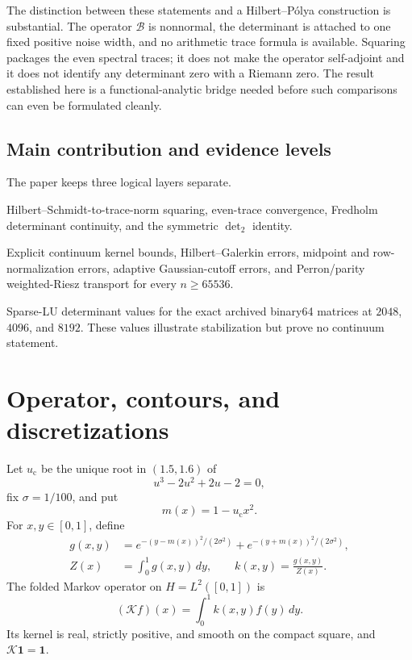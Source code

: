 \documentclass[11pt]{article}
\theoremstyle{definition}
\theoremstyle{remark}
\newcommand{\cK}{\mathcal K}
\newcommand{\cB}{\mathcal B}
\newcommand{\uc}{u_{\mathrm c}}
\begin{document}
The distinction between these statements and a Hilbert--P\'olya
construction is substantial.  The operator $\cB$ is nonnormal, the
determinant is attached to one fixed positive noise width, and no arithmetic
trace formula is available.  Squaring packages the even spectral traces; it
does not make the operator self-adjoint and it does not identify any
determinant zero with a Riemann zero.  The result established here is a
functional-analytic bridge needed before such comparisons can even be
formulated cleanly.

\subsection*{Main contribution and evidence levels}

The paper keeps three logical layers separate.
\begin{description}[leftmargin=3.2cm,style=nextline]
 \item[Analytic theorem]
 Hilbert--Schmidt-to-trace-norm squaring, even-trace convergence, Fredholm
 determinant continuity, and the symmetric $\det_2$ identity.
 \item[Outward certificate]
 Explicit continuum kernel bounds, Hilbert--Galerkin errors, midpoint and
 row-normalization errors, adaptive Gaussian-cutoff errors, and
 Perron/parity weighted-Riesz transport for every $n\ge65536$.
 \item[Floating diagnostic]
 Sparse-LU determinant values for the exact archived binary64 matrices at
 $2048$, $4096$, and $8192$.  These values illustrate stabilization but
 prove no continuum statement.
\end{description}

\section{Operator, contours, and discretizations}
\label{sec:operator}

Let $\uc$ be the unique root in $(1.5,1.6)$ of
\[
 u^3-2u^2+2u-2=0,
\]
fix $\sigma=1/100$, and put
\[
 m(x)=1-\uc x^2.
\]
For $x,y\in[0,1]$, define
\begin{align}
 g(x,y)&=
 e^{-(y-m(x))^2/(2\sigma^2)}
 +e^{-(y+m(x))^2/(2\sigma^2)},
 \label{eq:g-kernel}\\
 Z(x)&=\int_0^1g(x,y)\,dy,
 \qquad
 k(x,y)=\frac{g(x,y)}{Z(x)}.
 \label{eq:normalized-kernel}
\end{align}
The folded Markov operator on $H=L^2([0,1])$ is
\begin{equation}
 (\cK f)(x)=\int_0^1k(x,y)f(y)\,dy.
 \label{eq:markov-operator}
\end{equation}
Its kernel is real, strictly positive, and smooth on the compact square,
and $\cK\mathbf1=\mathbf1$.
\end{document}
